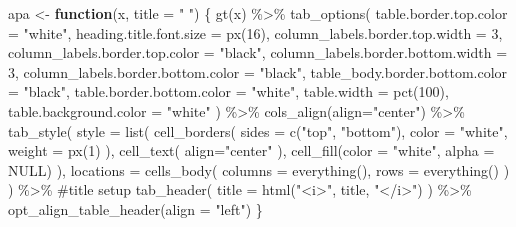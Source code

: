 \documentclass[
  letterpaper,
  DIV=11,
  numbers=noendperiod]{scrartcl}
\newenvironment{Shaded}{\begin{snugshade}}{\end{snugshade}}
\newcommand{\AttributeTok}[1]{\textcolor[rgb]{0.40,0.45,0.13}{#1}}
\newcommand{\CommentTok}[1]{\textcolor[rgb]{0.37,0.37,0.37}{#1}}
\newcommand{\ConstantTok}[1]{\textcolor[rgb]{0.56,0.35,0.01}{#1}}
\newcommand{\ControlFlowTok}[1]{\textcolor[rgb]{0.00,0.23,0.31}{\textbf{#1}}}
\newcommand{\DecValTok}[1]{\textcolor[rgb]{0.68,0.00,0.00}{#1}}
\newcommand{\FunctionTok}[1]{\textcolor[rgb]{0.28,0.35,0.67}{#1}}
\newcommand{\NormalTok}[1]{\textcolor[rgb]{0.00,0.23,0.31}{#1}}
\newcommand{\OtherTok}[1]{\textcolor[rgb]{0.00,0.23,0.31}{#1}}
\newcommand{\SpecialCharTok}[1]{\textcolor[rgb]{0.37,0.37,0.37}{#1}}
\newcommand{\StringTok}[1]{\textcolor[rgb]{0.13,0.47,0.30}{#1}}
\begin{document}
\begin{Shaded}
\begin{Highlighting}[]
\NormalTok{apa }\OtherTok{\textless{}{-}} \ControlFlowTok{function}\NormalTok{(x, }\AttributeTok{title =} \StringTok{" "}\NormalTok{) \{}
  \FunctionTok{gt}\NormalTok{(x) }\SpecialCharTok{\%\textgreater{}\%}
  \FunctionTok{tab\_options}\NormalTok{(}
    \AttributeTok{table.border.top.color =} \StringTok{"white"}\NormalTok{,}
    \AttributeTok{heading.title.font.size =} \FunctionTok{px}\NormalTok{(}\DecValTok{16}\NormalTok{),}
    \AttributeTok{column\_labels.border.top.width =} \DecValTok{3}\NormalTok{,}
    \AttributeTok{column\_labels.border.top.color =} \StringTok{"black"}\NormalTok{,}
    \AttributeTok{column\_labels.border.bottom.width =} \DecValTok{3}\NormalTok{,}
    \AttributeTok{column\_labels.border.bottom.color =} \StringTok{"black"}\NormalTok{,}
    \AttributeTok{table\_body.border.bottom.color =} \StringTok{"black"}\NormalTok{,}
    \AttributeTok{table.border.bottom.color =} \StringTok{"white"}\NormalTok{,}
    \AttributeTok{table.width =} \FunctionTok{pct}\NormalTok{(}\DecValTok{100}\NormalTok{),}
    \AttributeTok{table.background.color =} \StringTok{"white"}
\NormalTok{  ) }\SpecialCharTok{\%\textgreater{}\%}
  \FunctionTok{cols\_align}\NormalTok{(}\AttributeTok{align=}\StringTok{"center"}\NormalTok{) }\SpecialCharTok{\%\textgreater{}\%}
  \FunctionTok{tab\_style}\NormalTok{(}
    \AttributeTok{style =} \FunctionTok{list}\NormalTok{(}
      \FunctionTok{cell\_borders}\NormalTok{(}
        \AttributeTok{sides =} \FunctionTok{c}\NormalTok{(}\StringTok{"top"}\NormalTok{, }\StringTok{"bottom"}\NormalTok{),}
        \AttributeTok{color =} \StringTok{"white"}\NormalTok{,}
        \AttributeTok{weight =} \FunctionTok{px}\NormalTok{(}\DecValTok{1}\NormalTok{)}
\NormalTok{      ),}
      \FunctionTok{cell\_text}\NormalTok{(}
        \AttributeTok{align=}\StringTok{"center"}
\NormalTok{      ),}
      \FunctionTok{cell\_fill}\NormalTok{(}\AttributeTok{color =} \StringTok{"white"}\NormalTok{, }\AttributeTok{alpha =} \ConstantTok{NULL}\NormalTok{)}
\NormalTok{      ),}
    \AttributeTok{locations =} \FunctionTok{cells\_body}\NormalTok{(}
      \AttributeTok{columns =} \FunctionTok{everything}\NormalTok{(),}
      \AttributeTok{rows =} \FunctionTok{everything}\NormalTok{()}
\NormalTok{    )}
\NormalTok{  ) }\SpecialCharTok{\%\textgreater{}\%}
    \CommentTok{\#title setup}
    \FunctionTok{tab\_header}\NormalTok{(}
    \AttributeTok{title =} \FunctionTok{html}\NormalTok{(}\StringTok{"\textless{}i\textgreater{}"}\NormalTok{, title, }\StringTok{"\textless{}/i\textgreater{}"}\NormalTok{)}
\NormalTok{  ) }\SpecialCharTok{\%\textgreater{}\%}
  \FunctionTok{opt\_align\_table\_header}\NormalTok{(}\AttributeTok{align =} \StringTok{"left"}\NormalTok{)}
\NormalTok{\}}
\end{Highlighting}
\end{Shaded}
\end{document}
